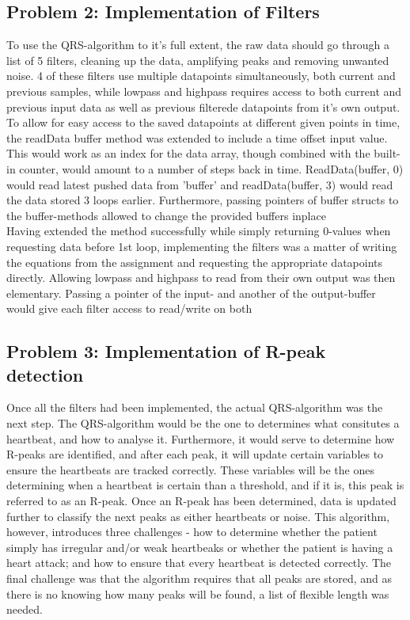 \documentclass[12pt,a4paper]{article}
\begin{document}
\subsection{Problem 2: Implementation of Filters}
	To use the QRS-algorithm to it's full extent, the raw data should go through a list of 5 filters, cleaning up the data, amplifying peaks and removing unwanted noise. 4 of these filters use multiple datapoints simultaneously, both current and previous samples, while lowpass and highpass requires access to both current and previous input data as well as previous filterede datapoints from it's own output. 
\\
To allow for easy access to the saved datapoints at different given points in time, the readData buffer method was extended to include a time offset input value. This would work as an index for the data array, though combined with the built-in counter, would amount to a number of steps back in time. ReadData(buffer, 0) would read latest pushed data from 'buffer' and readData(buffer, 3) would read the data stored 3 loops earlier. Furthermore, passing pointers of buffer structs to the buffer-methods allowed to change the provided buffers inplace\\	
Having extended the method successfully while simply returning 0-values when requesting data before 1st loop, implementing the filters was a matter of writing the equations from the assignment and requesting the appropriate datapoints directly.
	Allowing lowpass and highpass to read from their own output was then elementary. Passing a pointer of the input- and another of the output-buffer would give each filter access to read/write on both\\

\subsection{Problem 3: Implementation of R-peak detection}
	Once all the filters had been implemented, the actual QRS-algorithm was the next step. The QRS-algorithm would be the one to determines what consitutes a heartbeat, and how to analyse it. Furthermore, it would serve to determine how R-peaks are identified, and after each peak, it will update certain variables to ensure the heartbeats are tracked correctly. These variables will be the ones determining when a heartbeat is certain than a threshold, and if it is, this peak is referred to as an R-peak. Once an R-peak has been determined, data is updated further to classify the next peaks as either heartbeats or noise. This algorithm, however, introduces three challenges - how to determine whether the patient simply has irregular and/or weak heartbeaks or whether the patient is having a heart attack; and how to ensure that every heartbeat is detected correctly. The final challenge was that the algorithm requires that all peaks are stored, and as there is no knowing how many peaks will be found, a list of flexible length was needed.\\
\end{document}

